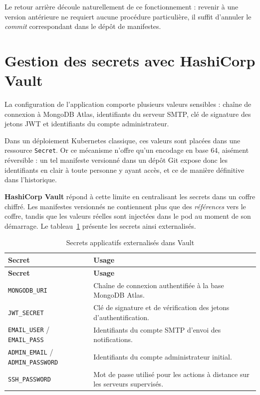 Le retour arrière découle naturellement de ce fonctionnement : revenir à une version
antérieure ne requiert aucune procédure particulière, il suffit d'annuler le
\textit{commit} correspondant dans le dépôt de manifestes.

\section{Gestion des secrets avec HashiCorp Vault}
La configuration de l'application comporte plusieurs valeurs sensibles : chaîne de
connexion à MongoDB Atlas, identifiants du serveur SMTP, clé de signature des jetons JWT
et identifiants du compte administrateur.

Dans un déploiement Kubernetes classique, ces valeurs sont placées dans une ressource
\texttt{Secret}. Or ce mécanisme n'offre qu'un encodage en base 64, aisément réversible :
un tel manifeste versionné dans un dépôt Git expose donc les identifiants en clair à
toute personne y ayant accès, et ce de manière définitive dans l'historique.

\textbf{HashiCorp Vault} répond à cette limite en centralisant les secrets dans un coffre
chiffré. Les manifestes versionnés ne contiennent plus que des \emph{références} vers le
coffre, tandis que les valeurs réelles sont injectées dans le pod au moment de son
démarrage. Le tableau~\ref{tab:vault} présente les secrets ainsi externalisés.

\renewcommand{\arraystretch}{1.3}
\begin{longtable}{|>{\raggedright\arraybackslash}p{4.6cm}
                  |>{\raggedright\arraybackslash}p{9.2cm}|}
\hline
\textbf{Secret} & \textbf{Usage} \\
\hline
\endfirsthead

\hline
\textbf{Secret} & \textbf{Usage} \\
\hline
\endhead

\hline
\caption{Secrets applicatifs externalisés dans Vault}
\label{tab:vault}
\endlastfoot

\texttt{MONGODB\_URI} & Chaîne de connexion authentifiée à la base MongoDB Atlas. \\
\hline
\texttt{JWT\_SECRET} & Clé de signature et de vérification des jetons d'authentification. \\
\hline
\texttt{EMAIL\_USER} / \texttt{EMAIL\_PASS} & Identifiants du compte SMTP d'envoi des notifications. \\
\hline
\texttt{ADMIN\_EMAIL} / \texttt{ADMIN\_PASSWORD} & Identifiants du compte administrateur initial. \\
\hline
\texttt{SSH\_PASSWORD} & Mot de passe utilisé pour les actions à distance sur les serveurs supervisés. \\
\hline

\end{longtable}

